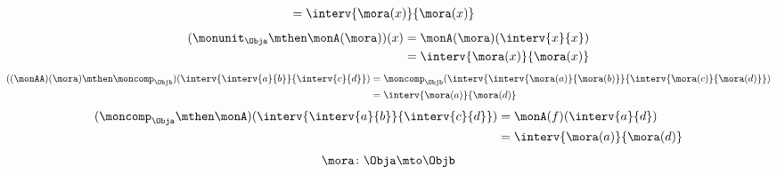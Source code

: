 {\begin{forslides}
\begin{equation*}
\begin{aligned}
&=\interv{\mora(x)}{\mora(x)}
\end{aligned}
\end{equation*}
\begin{equation*}
\label{eq:arrow_2}
\begin{aligned}
(\monunit_\Obja \mthen \monA(\mora))(x)&=\monA(\mora)(\interv{x}{x})\\
&=\interv{\mora(x)}{\mora(x)}
\end{aligned}
\end{equation*}
\begin{equation*}
\label{eq:arrow_3}
\begin{aligned}
((\monAA)(\mora)\mthen \moncomp_\Objb)(\interv{\interv{a}{b}}{\interv{c}{d}})&=\moncomp_\Objb(\interv{\interv{\mora(a)}{\mora(b)}}{\interv{\mora(c)}{\mora(d)}})\\
&=\interv{\mora(a)}{\mora(d)}
\end{aligned}
\end{equation*}
\begin{equation*}
\label{eq:arrow_4}
\begin{aligned}
(\moncomp_\Obja\mthen \monA)(\interv{\interv{a}{b}}{\interv{c}{d}})&=\monA(f)(\interv{a}{d})\\
&=\interv{\mora(a)}{\mora(d)}
\end{aligned}
\end{equation*}
\begin{equation*}
\label{eq:arrow_5}
\mora\colon \Obja \mto \Objb
\end{equation*}
\end{forslides}
}
